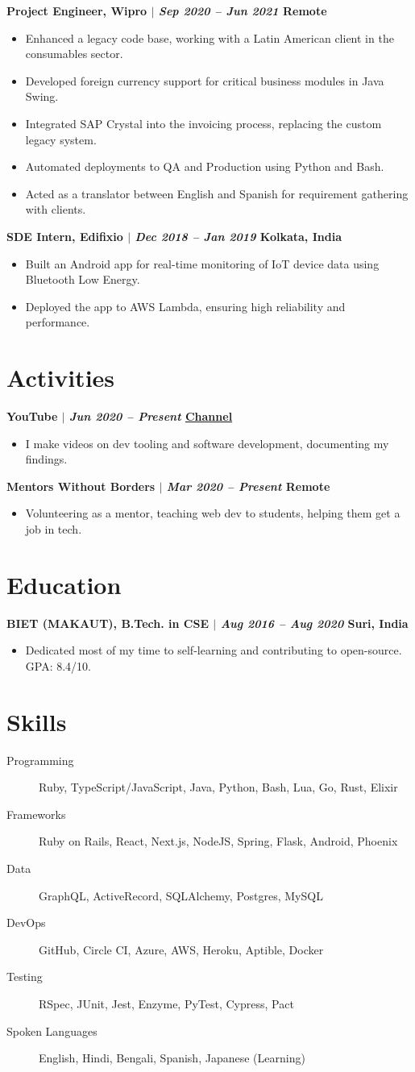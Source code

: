 \documentclass[11pt]{article} %
\newcommand{\uthree}[4]{
    {\large
        {\bfseries #1 $|$ \textit{#2} \hfill #3} \par
    }
    \begin{itemize}
        #4
    \end{itemize}
    \par\addvspace{2.5ex}%
}
\begin{document}
\uthree{Project Engineer, Wipro}{Sep 2020 -- Jun 2021}{Remote}{
  \item Enhanced a legacy code base, working with a Latin American client in the consumables sector.
  \item Developed foreign currency support for critical business modules in Java Swing.
  \item Integrated SAP Crystal into the invoicing process, replacing the custom legacy system.
  \item Automated deployments to QA and Production using Python and Bash.
  \item Acted as a translator between English and Spanish for requirement gathering with clients.
}

\uthree{SDE Intern, Edifixio}{Dec 2018 -- Jan 2019}{Kolkata, India}{
  \item Built an Android app for real-time monitoring of IoT device data using Bluetooth Low Energy.
  \item Deployed the app to AWS Lambda, ensuring high reliability and performance.
}

\section{Activities}
\uthree{YouTube}{Jun 2020 -- Present}{\href{http://youtube.com/c/2kabhishek}{Channel}}{
  \item I make videos on dev tooling and software development, documenting my findings.
}

\uthree{Mentors Without Borders}{Mar 2020 -- Present}{Remote}{
  \item Volunteering as a mentor, teaching web dev to students, helping them get a job in tech.
}

\section{Education}
\uthree{BIET (MAKAUT), B.Tech. in CSE}{Aug 2016 -- Aug 2020}{Suri, India}{
    \item Dedicated most of my time to self-learning and contributing to open-source. GPA: 8.4/10.
}

\section{Skills}
\begin{description}
  \item[Programming] Ruby, TypeScript/JavaScript, Java, Python, Bash, Lua, Go, Rust, Elixir
  \item[Frameworks] Ruby on Rails, React, Next.js, NodeJS, Spring, Flask, Android, Phoenix
  \item[Data] GraphQL, ActiveRecord, SQLAlchemy, Postgres, MySQL
  \item[DevOps] GitHub, Circle CI, Azure, AWS, Heroku, Aptible, Docker
  \item[Testing] RSpec, JUnit, Jest, Enzyme, PyTest, Cypress, Pact
  \item[Spoken Languages] English, Hindi, Bengali, Spanish, Japanese (Learning)
\end{description}
\end{document}
